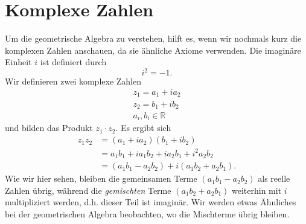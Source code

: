 %
%
%
%
\section{Komplexe Zahlen
\label{geoalgebra:section:komplexe-zahlen}}
Um die geometrische Algebra zu verstehen, hilft es, wenn wir nochmals kurz die komplexen Zahlen anschauen, da sie ähnliche Axiome verwenden.
Die imaginäre Einheit $i$ ist definiert durch
\begin{equation}
  i^2 = -1.
\end{equation}
Wir definieren zwei komplexe Zahlen
\begin{align*}
  z_1 = a_1 + i a_2 \\
  z_2 = b_1 + i b_2 \\ 
  a_i, b_i \in \mathbb{R}
\end{align*}
und bilden das Produkt $z_1 \cdot{} z_2$. Es ergibt sich
\begin{align*}
  z_1 z_2 &= (a_1 + i a_2) (b_1 + i b_2) \\
  &= a_1 b_1 + i a_1 b_2 + i a_2 b_1 + i^2 a_2 b_2 \\
  &= (a_1 b_1 - a_2 b_2) + i (a_1 b_2 + a_2 b_1).
\end{align*}
Wie wir hier sehen, bleiben die gemeinsamen Terme $(a_1 b_1 - a_2 b_2)$ als reelle Zahlen übrig, während die \emph{gemischten} Terme $(a_1 b_2 + a_2 b_1)$ weiterhin mit $i$
multipliziert werden, d.h. dieser Teil ist imaginär. Wir werden etwas Ähnliches bei der geometrischen Algebra beobachten, wo die Mischterme übrig bleiben.




